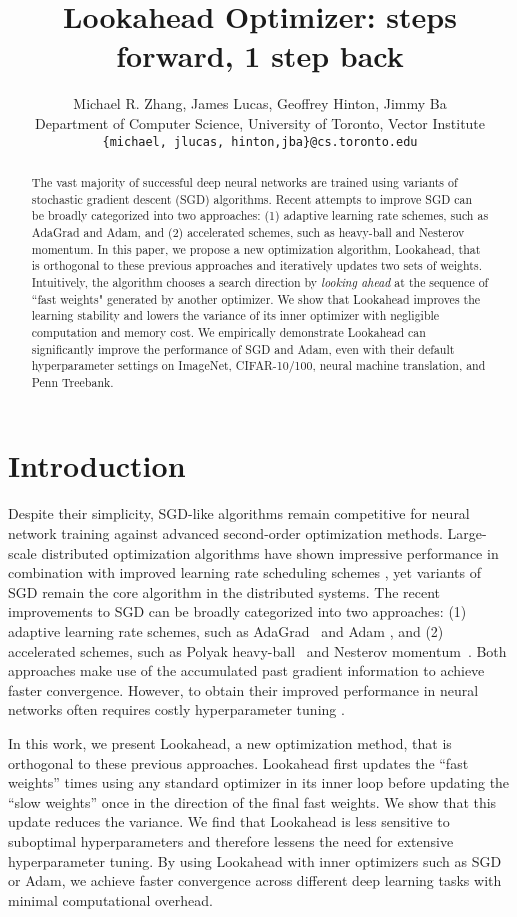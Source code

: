\documentclass{article}
\title{Lookahead Optimizer:  steps forward, 1 step back}
\author{  Michael R. Zhang, 
  James Lucas,  
  Geoffrey Hinton, 
  Jimmy Ba\\
  Department of Computer Science, University of Toronto, Vector Institute \\
  \texttt{\{michael, jlucas, hinton,jba\}@cs.toronto.edu}
}
\begin{document}
\maketitle
\begin{abstract}
The vast majority of successful deep neural networks are trained using variants of stochastic gradient descent (SGD) algorithms. Recent attempts to improve SGD can be broadly categorized into two approaches: (1) adaptive learning rate schemes, such as AdaGrad and Adam, and (2) accelerated schemes, such as heavy-ball and Nesterov momentum. In this paper, we propose a new optimization algorithm, Lookahead, that is orthogonal to these previous approaches and iteratively updates two sets of weights.
Intuitively, the algorithm chooses a search direction by \emph{looking ahead} at the sequence of ``fast weights" generated by another optimizer.
We show that Lookahead improves the learning stability and lowers the variance of its inner optimizer with negligible computation and memory cost. We empirically demonstrate Lookahead can significantly improve the performance of SGD and Adam, even with their default hyperparameter settings on ImageNet, CIFAR-10/100, neural machine translation, and Penn Treebank.  

\end{abstract} \section{Introduction}
\label{sec:intro}
Despite their simplicity, SGD-like algorithms remain competitive for neural network training against advanced second-order optimization methods.  Large-scale distributed optimization algorithms \citep{goyal2017accurate, you2018imagenet} have shown impressive performance in combination with improved learning rate scheduling schemes \citep{vaswani2017attention,radford2018improving}, yet variants of SGD remain the core algorithm in the distributed systems. The recent improvements to SGD  can be broadly categorized into two approaches:  (1) adaptive learning rate schemes, such as AdaGrad~\citep{duchi2011adaptive} and Adam \citep{kingma2014adam}, and (2) accelerated schemes, such as Polyak heavy-ball~\citep{polyak1964some} and Nesterov momentum~\citep{nesterov1983method}.  Both approaches make use of the accumulated past gradient information to achieve faster convergence.  However, to obtain their improved performance in neural networks often requires costly hyperparameter tuning  \citep{montavon2012neural}. 

In this work, we present Lookahead, a new optimization method, that is orthogonal to these previous approaches.  Lookahead first updates the ``fast weights'' \citep{hinton1987using}  times using any standard optimizer in its inner loop before updating the ``slow weights'' once in the direction of the final fast weights. We show that this update reduces the variance. We find that Lookahead is less sensitive to suboptimal hyperparameters and therefore lessens the need for extensive hyperparameter tuning. By using Lookahead with inner optimizers such as SGD or Adam, we achieve faster convergence across different deep learning tasks with minimal computational overhead.
\end{document}
